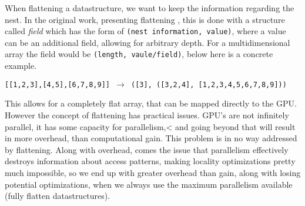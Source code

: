When flattening a datastructure, we want to keep the information regarding the nest. In the original work, presenting flattening \cite{flat}, this is done with a structure called \textit{field} which has the form of \texttt{(nest information, value)}, where a value can be an additional field, allowing for arbitrary depth. For a multidimensional array the field would be \texttt{(length, vaule/field)}, below here is a concrete example.
\begin{center}
\texttt{[[1,2,3],[4,5],[6,7,8,9]] $\to$ ([3], ([3,2,4], [1,2,3,4,5,6,7,8,9]))}
\end{center}
This allows for a completely flat array, that can be mapped directly to the GPU. However the concept of flattening has practical issues. GPU's are not infinitely parallel, it has some capacity for parallelism,< and going beyond that will result in more overhead, than computational gain. This problem is in no way addressed by flattening. Along with overhead, comes the issue that parallelism effectively destroys information about access patterns, making locality optimizations pretty much impossible, so we end up with greater overhead than gain, along with losing potential optimizations, when we always use the maximum parallelism available (fully flatten datastructures). 

